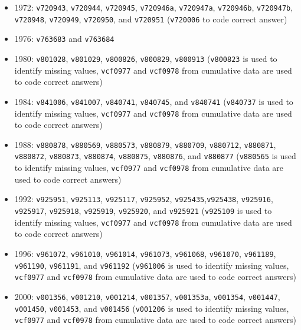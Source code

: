 \begin{itemize}
    \item 1972: \texttt{v720943}, \texttt{v720944}, \texttt{v720945}, \texttt{v720946a}, \texttt{v720947a}, \texttt{v720946b}, \texttt{v720947b}, \texttt{v720948}, \texttt{v720949}, \texttt{v720950}, and \texttt{v720951}  (\texttt{v720006} to code correct answer)
    \item 1976: \texttt{v763683} and \texttt{v763684}
    \item 1980: \texttt{v801028}, \texttt{v801029}, \texttt{v800826}, \texttt{v800829}, \texttt{v800913} (\texttt{v800823} is used to identify missing values, \texttt{vcf0977} and \texttt{vcf0978} from cumulative data are used to code correct answers)
    \item 1984: \texttt{v841006}, \texttt{v841007}, \texttt{v840741}, \texttt{v840745}, and \texttt{v840741} (\texttt{v840737} is used to identify missing values, \texttt{vcf0977} and \texttt{vcf0978} from cumulative data are used to code correct answers)
    \item 1988: \texttt{v880878}, \texttt{v880569}, \texttt{v880573}, \texttt{v880879}, \texttt{v880709}, \texttt{v880712}, \texttt{v880871}, \texttt{v880872}, \texttt{v880873}, \texttt{v880874}, \texttt{v880875}, \texttt{v880876}, and \texttt{v880877} (\texttt{v880565} is used to identify missing values, \texttt{vcf0977} and \texttt{vcf0978} from cumulative data are used to code correct answers)
    \item 1992: \texttt{v925951}, \texttt{v925113}, \texttt{v925117}, \texttt{v925952}, \texttt{v925435},\texttt{v925438}, \texttt{v925916}, \texttt{v925917}, \texttt{v925918}, \texttt{v925919}, \texttt{v925920}, and \texttt{v925921} (\texttt{v925109} is used to identify missing values, \texttt{vcf0977} and \texttt{vcf0978} from cumulative data are used to code correct answers)
    \item 1996: \texttt{v961072}, \texttt{v961010}, \texttt{v961014}, \texttt{v961073}, \texttt{v961068}, \texttt{v961070}, \texttt{v961189}, \texttt{v961190}, \texttt{v961191}, and \texttt{v961192} (\texttt{v961006} is used to identify missing values, \texttt{vcf0977} and \texttt{vcf0978} from cumulative data are used to code correct answers)
    \item 2000: \texttt{v001356}, \texttt{v001210}, \texttt{v001214}, \texttt{v001357}, \texttt{v001353a}, \texttt{v001354}, \texttt{v001447}, \texttt{v001450}, \texttt{v001453}, and \texttt{v001456} (\texttt{v001206} is used to identify missing values, \texttt{vcf0977} and \texttt{vcf0978} from cumulative data are used to code correct answers)

\end{itemize}
